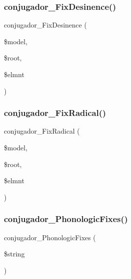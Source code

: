 \subsubsection{\texorpdfstring{conjugador\+\_\+\+Fix\+Desinence()}{conjugador\_FixDesinence()}}
{\footnotesize\ttfamily conjugador\+\_\+\+Fix\+Desinence (\begin{DoxyParamCaption}\item[{}]{\$model,  }\item[{}]{\$root,  }\item[{}]{\$elmnt }\end{DoxyParamCaption})}

\hypertarget{conjugador__lib_8inc_a76b9b56f90098bda21fa8043ae7318ae}{}\label{conjugador__lib_8inc_a76b9b56f90098bda21fa8043ae7318ae} 
\subsubsection{\texorpdfstring{conjugador\+\_\+\+Fix\+Radical()}{conjugador\_FixRadical()}}
{\footnotesize\ttfamily conjugador\+\_\+\+Fix\+Radical (\begin{DoxyParamCaption}\item[{}]{\$model,  }\item[{}]{\$root,  }\item[{}]{\$elmnt }\end{DoxyParamCaption})}

\hypertarget{conjugador__lib_8inc_a672ae0386cba05339c0708b743535c7a}{}\label{conjugador__lib_8inc_a672ae0386cba05339c0708b743535c7a} 
\subsubsection{\texorpdfstring{conjugador\+\_\+\+Phonologic\+Fixes()}{conjugador\_PhonologicFixes()}}
{\footnotesize\ttfamily conjugador\+\_\+\+Phonologic\+Fixes (\begin{DoxyParamCaption}\item[{}]{\$string }\end{DoxyParamCaption})}

